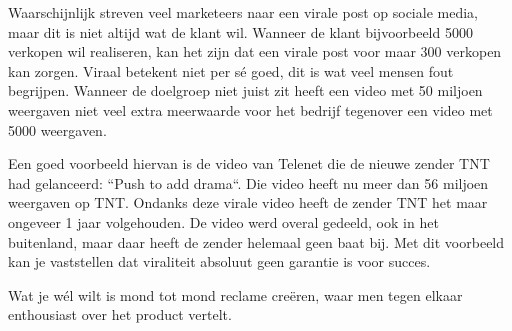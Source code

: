 Waarschijnlijk streven veel marketeers naar een virale post op sociale media, maar dit is niet altijd wat de klant wil. Wanneer de klant bijvoorbeeld 5000 verkopen wil realiseren, kan het zijn dat een virale post voor maar 300 verkopen kan zorgen. Viraal betekent niet per sé goed, dit is wat veel mensen fout begrijpen. Wanneer de doelgroep niet juist zit heeft een video met 50 miljoen weergaven niet veel extra meerwaarde voor het bedrijf tegenover een video met 5000 weergaven.

Een goed voorbeeld hiervan is de video van Telenet die de nieuwe zender TNT had gelanceerd: ``Push to add drama``. Die video heeft nu meer dan 56 miljoen weergaven op TNT. Ondanks deze virale video heeft de zender TNT het maar ongeveer 1 jaar volgehouden. De video werd overal gedeeld, ook in het buitenland, maar daar heeft de zender helemaal geen baat bij. Met dit voorbeeld kan je vaststellen dat viraliteit absoluut geen garantie is voor succes.

Wat je wél wilt is mond tot mond reclame creëren, waar men tegen elkaar enthousiast over het product vertelt.

